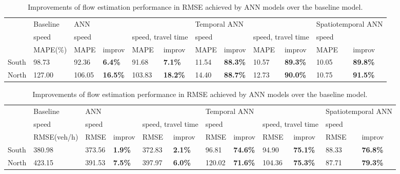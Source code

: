 \documentclass[english]{kththesis}
\begin{document}
\begin{table}
\centering
\begin{tabular}{@{}llllllllllll@{}}
\toprule
& Baseline & \multicolumn{4}{l}{ANN} & \multicolumn{4}{l}{Temporal ANN} & \multicolumn{2}{l}{Spatiotemporal ANN} \\
\cmidrule(lr){3-6} \cmidrule(lr){7-10} \cmidrule(lr){11-12}
& speed & \multicolumn{2}{l}{speed} & \multicolumn{2}{l}{speed, travel time} & \multicolumn{2}{l}{speed} & \multicolumn{2}{l}{speed, travel time} & \multicolumn{2}{l}{speed} \\
\cmidrule(lr){3-4} \cmidrule(lr){5-6} \cmidrule(lr){7-8} \cmidrule(lr){9-10} \cmidrule(lr){11-12}
& MAPE(\%) & MAPE & improv & MAPE & improv & MAPE & improv & MAPE & improv & MAPE & improv \\
\midrule
South & 98.73 & 92.36  & \textbf{6.4\%} & 91.68 & \textbf{7.1\%} & 11.54 & \textbf{88.3\%} & 10.57 & \textbf{89.3\%} & 10.05 & \textbf{89.8\%} \\
North & 127.00 & 106.05 & \textbf{16.5\%} & 103.83 & \textbf{18.2\%} & 14.40 & \textbf{88.7\%} & 12.73 & \textbf{90.0\%} & 10.75 & \textbf{91.5\%} \\
\bottomrule
\end{tabular}
\caption{Improvements of flow estimation performance in MAPE achieved by ANN models over the baseline model.}
\label{tab:mape_imrpov}

\bigskip
\bigskip

\begin{tabular}{@{}llllllllllll@{}}
\toprule
& Baseline & \multicolumn{4}{l}{ANN} & \multicolumn{4}{l}{Temporal ANN} & \multicolumn{2}{l}{Spatiotemporal ANN} \\
\cmidrule(lr){3-6} \cmidrule(lr){7-10} \cmidrule(lr){11-12}
& speed & \multicolumn{2}{l}{speed} & \multicolumn{2}{l}{speed, travel time} & \multicolumn{2}{l}{speed} & \multicolumn{2}{l}{speed, travel time} & \multicolumn{2}{l}{speed} \\
\cmidrule(lr){3-4} \cmidrule(lr){5-6} \cmidrule(lr){7-8} \cmidrule(lr){9-10} \cmidrule(lr){11-12}
& RMSE(veh/h) & RMSE & improv & RMSE & improv & RMSE & improv & RMSE & improv & RMSE & improv \\
\midrule
South & 380.98 & 373.56  & \textbf{1.9\%} & 372.83 & \textbf{2.1\%} & 96.81 & \textbf{74.6\%} & 94.90 & \textbf{75.1\%} & 88.33 & \textbf{76.8\%} \\
North & 423.15 & 391.53 & \textbf{7.5\%} & 397.97 & \textbf{6.0\%} & 120.02 & \textbf{71.6\%} & 104.36 & \textbf{75.3\%} & 87.71 & \textbf{79.3\%} \\
\bottomrule
\end{tabular}
\caption{Improvements of flow estimation performance in RMSE achieved by ANN models over the baseline model.}
\label{tab:rmse_imrpov}
\end{table}
\end{document}
